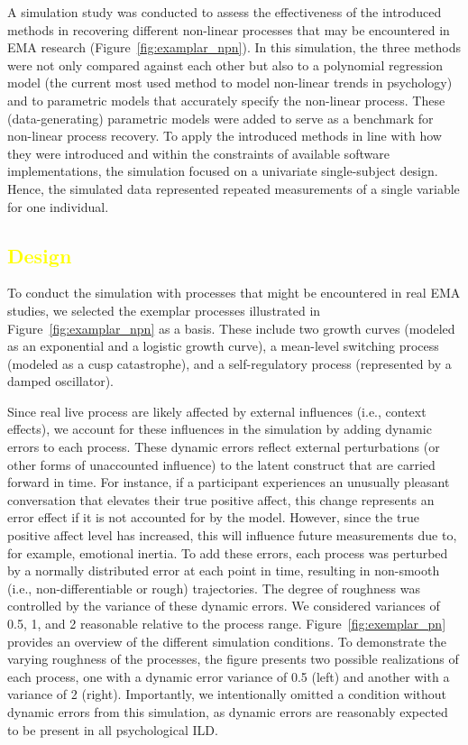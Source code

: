 \documentclass[man, floatsintext]{apa7}
\begin{document}
A simulation study was conducted to assess the effectiveness of the introduced
methods in recovering different non-linear processes that may be encountered in
EMA research (Figure~\ref{fig:examplar_npn}). In this simulation, the three
methods were not only compared against each other but also to a polynomial
regression model (the current most used method to model non-linear trends in
psychology) and to parametric models that accurately specify the non-linear
process. These (data-generating) parametric models were added to serve as a
benchmark for non-linear process recovery. To apply the introduced methods in
line with how they were introduced and within the constraints of available
software implementations, the simulation focused on a univariate single-subject
design. Hence, the simulated data represented repeated measurements of a single
variable for one individual.

\subsection{\textcolor{yellow}{Design}}

To conduct the simulation with processes that might be encountered in real EMA
studies, we selected the exemplar processes illustrated in
Figure~\ref{fig:examplar_npn} as a basis. These include two growth curves
(modeled as an exponential and a logistic growth curve), a mean-level switching
process (modeled as a cusp catastrophe), and a self-regulatory process
(represented by a damped oscillator).

Since real live process are likely affected by external influences (i.e.,
context effects), we account for these influences in the simulation by adding
dynamic errors to each process. These dynamic errors reflect external
perturbations (or other forms of unaccounted influence) to the latent construct
that are carried forward in time. For instance, if a participant experiences an
unusually pleasant conversation that elevates their true positive affect, this
change represents an error effect if it is not accounted for by the model.
However, since the true positive affect level has increased, this will
influence future measurements due to, for example, emotional inertia. To add
these errors, each process was perturbed by a normally distributed error at
each point in time, resulting in non-smooth (i.e., non-differentiable or rough)
trajectories. The degree of roughness was controlled by the variance of these
dynamic errors. We considered variances of 0.5, 1, and 2 reasonable relative to
the process range. Figure~\ref{fig:exemplar_pn} provides an overview of the
different simulation conditions. To demonstrate the varying roughness of the
processes, the figure presents two possible realizations of each process, one
with a dynamic error variance of 0.5 (left) and another with a variance of 2
(right). Importantly, we intentionally omitted a condition without dynamic
errors from this simulation, as dynamic errors are reasonably expected to be
present in all psychological ILD\@.
\end{document}
